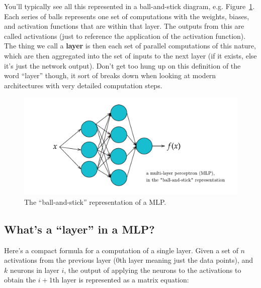 \documentclass[
  11pt,
  numbers=noendperiod]{book}
\begin{document}
You'll typically see all this represented in a ball-and-stick diagram,
e.g. Figure~\ref{fig-ballandstick}. Each series of balls represents one
set of computations with the weights, biases, and activation functions
that are within that layer. The outputs from this are called activations
(just to reference the application of the activation function). The
thing we call a \textbf{layer} is then each set of parallel computations
of this nature, which are then aggregated into the set of inputs to the
next layer (if it exists, else it's just the network output). Don't get
too hung up on this definition of the word ``layer'' though, it sort of
breaks down when looking at modern architectures with very detailed
computation steps.

\begin{figure}

{\centering \includegraphics{./images/mlp.pdf}

}

\caption{\label{fig-ballandstick}The ``ball-and-stick'' representation
of a MLP.}

\end{figure}

\hypertarget{whats-a-layer-in-a-mlp}{%
\subsection{What's a ``layer'' in a MLP?}\label{whats-a-layer-in-a-mlp}}

Here's a compact formula for a computation of a single layer. Given a
set of \(n\) activations from the previous layer (0th layer meaning just
the data points), and \(k\) neurons in layer \(i\), the output of
applying the neurons to the activations to obtain the \(i+1\)th layer is
represented as a matrix equation:
\end{document}
